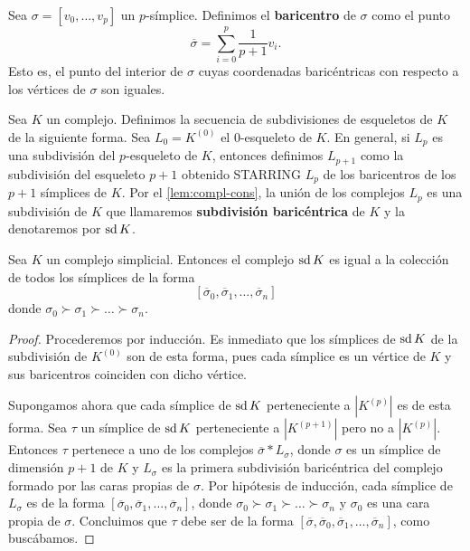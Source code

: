 \begin{definicion}
	Sea $\sigma = [v_0, \dots, v_p]$ un $p$-símplice. Definimos el \textbf{baricentro} de $\sigma$ como el punto
	\[
	\overline{\sigma} = \sum_{i=0}^{p}\frac{1}{p+1} v_i.
	\]
	Esto es, el punto del interior de $\sigma$ cuyas coordenadas baricéntricas con respecto a los vértices de $\sigma$ son iguales.
\end{definicion}
\begin{definicion}
	Sea $K$ un complejo. Definimos la secuencia de subdivisiones de esqueletos de $K$ de la siguiente forma. Sea $L_0 = K^{(0)}$ el $0$-esqueleto de $K$. En general, si $L_p$ es una subdivisión del $p$-esqueleto de $K$, entonces definimos $L_{p+1}$ como la subdivisión del esqueleto $p+1$ obtenido STARRING $L_p$ de los baricentros de los $p+1$ símplices de $K$. Por el \autoref{lem:compl-cons}, la unión de los complejos $L_p$ es una subdivisión de $K$ que llamaremos \textbf{subdivisión baricéntrica} de $K$ y la denotaremos por $\operatorname{sd} K$.
\end{definicion}
\begin{lema}
	Sea $K$ un complejo simplicial. Entonces el complejo $\operatorname{sd} K$ es igual a la colección de todos los símplices de la forma
	\[
		[\overline{\sigma}_0,\overline{\sigma}_1,\dots,\overline{\sigma}_n]
	\]
	donde $\sigma_0 \succ \sigma_1 \succ \dots \succ \sigma_n$.
\end{lema}
\begin{proof}
	Procederemos por inducción. Es inmediato que los símplices de $\operatorname{sd} K$ de la subdivisión de $K^{(0)}$ son de esta forma, pues cada símplice es un vértice de $K$ y sus baricentros coinciden con dicho vértice.
	
	Supongamos ahora que cada símplice de $\operatorname{sd} K$ perteneciente a $|K^{(p)}|$ es de esta forma. Sea $\tau$ un símplice de $\operatorname{sd} K$ perteneciente a $|K^{(p+1)}|$ pero no a $|K^{(p)}|$. Entonces $\tau$ pertenece a uno de los complejos $\overline{\sigma} \ast L_{\sigma}$, donde $\sigma$ es un símplice de dimensión $p+1$ de $K$ y $L_{\sigma}$ es la primera subdivisión baricéntrica del complejo formado por las caras propias de $\sigma$. Por hipótesis de inducción, cada símplice de $L_{\sigma}$ es de la forma $[\overline{\sigma}_0,\overline{\sigma}_1,\dots,\overline{\sigma}_n]$, donde $\sigma_0 \succ \sigma_1 \succ \dots \succ \sigma_n$ y $\sigma_0$ es una cara propia de $\sigma$. Concluimos que $\tau$ debe ser de la forma $[\overline{\sigma},\overline{\sigma}_0,\overline{\sigma}_1,\dots,\overline{\sigma}_n]$, como buscábamos.
\end{proof}

